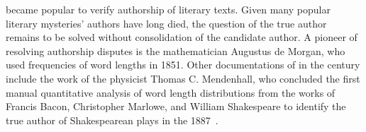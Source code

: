 
\ai{} became popular to verify authorship of literary texts.
Given many popular literary mysteries' authors have long died, the question of the true author remains to be solved without consolidation of the candidate author.
A pioneer of resolving authorship disputes is the mathematician Augustus de Morgan, who used frequencies of word lengths in 1851.
Other documentations of \ai{} in the  century include the work of the physicist Thomas C. Mendenhall, who concluded the first manual quantitative analysis of word length distributions from the works of Francis Bacon, Christopher Marlowe, and William Shakespeare to identify the true author of Shakespearean plays in the 1887~\citep{neal_surveying_2018,stamatatos_survey_2009}.

